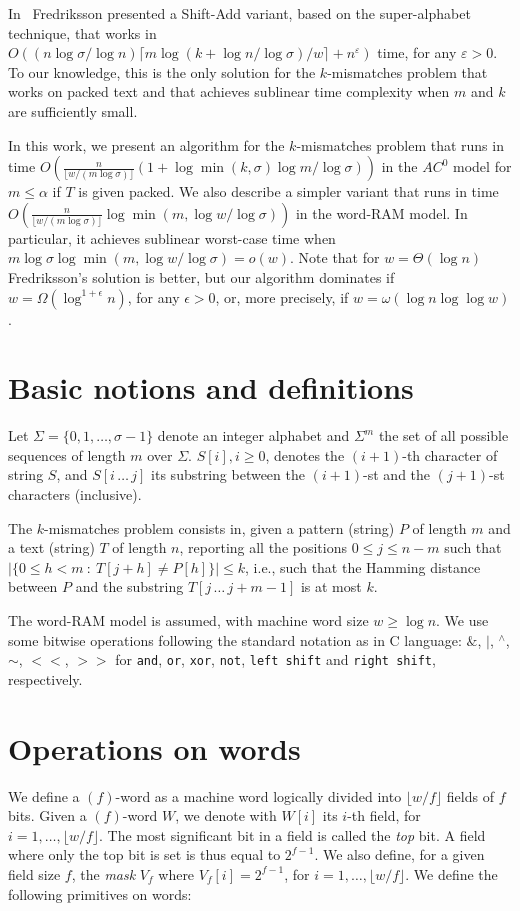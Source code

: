 \documentclass{llncs}
\newcommand{\ceil}[1]{\lceil #1 \rceil}
\newcommand{\floor}[1]{\lfloor #1 \rfloor}
\newcommand{\fsize}{f}
\newcommand{\word}[1]{#1}
\newcommand{\sabound}{$O((n \log\sigma/\log n)\ceil{m \log (k +  \log n / \log\sigma) / w} + n^{\varepsilon})$\xspace}
\newcommand{\acbound}{$O(\frac{n}{\floor{w/(m\log\sigma)}} (1 + \log \min(k,\sigma) \log m / \log\sigma))$\xspace}
\newcommand{\wrbound}{$O(\frac{n}{\floor{w/(m\log\sigma)}}\log \min(m, \log w / \log\sigma))$\xspace}
\newcommand{\fword}[1]{$(#1)$-word}
\begin{document}
In~\cite{Fredriksson2002} Fredriksson presented a Shift-Add variant,
based on the super-alphabet technique, that works in \sabound time,
for any $\varepsilon > 0$. To our knowledge, this is the only solution
for the $k$-mismatches problem that works on packed text and that
achieves sublinear time complexity when $m$ and $k$ are sufficiently
small.

In this work, we present an algorithm for the $k$-mismatches problem
that runs in time \acbound in the $AC^0$ model for $m\le \alpha$ if
$T$ is given packed. We also describe a simpler variant that runs in
time \wrbound in the word-RAM model. In particular, it achieves
sublinear worst-case time when $m\log\sigma\log\min(m, \log w / \log\sigma)
= o(w)$. Note that for $w = \Theta(\log n)$ Fredriksson's solution is
better, but our algorithm dominates if $w = \Omega(\log^{1+\epsilon}n)$, for any $\epsilon > 0$, or, more precisely, if $w=\omega(\log n \log \log w)$.


\section{Basic notions and definitions}
\noindent
Let $\Sigma = \{0, 1, \ldots, \sigma - 1\}$ denote an integer alphabet
and $\Sigma^m$ the set of all possible
sequences of length $m$ over $\Sigma$.
$S[i], i \geq 0$, denotes the $(i+1)$-th character of string $S$, and
$S[i\,\ldots\,j]$ its substring between the $(i+1)$-st and the
$(j+1)$-st characters (inclusive).

The $k$-mismatches problem consists in, given a pattern (string) $P$
of length $m$ and a text (string) $T$ of length $n$, reporting all the
positions $0 \leq j \leq n-m$ such that $|\{0 \leq h < m\ :\ T[j +
  h]\neq P[h]\}|\le k$, i.e., such that the Hamming distance between
$P$ and the substring $T[j\,\ldots\,j+m-1]$
is at most $k$.

The word-RAM model is assumed, with machine word size $w \ge \log
n$. We use some bitwise operations following the standard notation as
in C language: $\&$, $|$, $^\wedge$, $\sim$, $<<$, $>>$ for
\texttt{and}, \texttt{or}, \texttt{xor}, \texttt{not}, \texttt{left
  shift} and \texttt{right shift}, respectively.

\section{Operations on words}

We define a \fword{f} as a machine word logically divided into
$\floor{w/f}$ fields of $\fsize$ bits. Given a \fword{f} $\word{W}$,
we denote with $\word{W}[i]$ its $i$-th field, for
$i=1,\ldots,\floor{w/f}$. The most significant bit in a field is
called the \emph{top} bit.
A field where only the top bit is set is thus equal to $2^{\fsize-1}$.
We also define, for a given field size
$\fsize$, the \emph{mask} $V_{\fsize}$ where $\word{V}_{\fsize}[i]
= 2^{\fsize-1}$, for $i=1,\ldots,\floor{w/f}$. We define the following
primitives on words:
\end{document}

